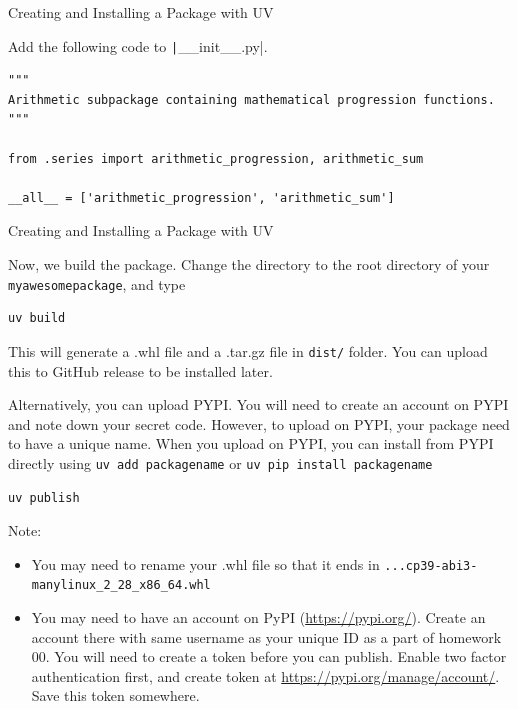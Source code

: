 \documentclass[aspectratio=169,xcolor=dvipsnames,svgnames,x11names,fleqn]{beamer}
\begin{document}
\begin{frame}[containsverbatim]{Creating and Installing a Package with UV}

Add the following code to \texttt|__init__.py|.

\begin{verbatim}
"""
Arithmetic subpackage containing mathematical progression functions.
"""

from .series import arithmetic_progression, arithmetic_sum

__all__ = ['arithmetic_progression', 'arithmetic_sum']

    \end{verbatim}

\end{frame}

\begin{frame}[containsverbatim]{Creating and Installing a Package with UV}

    \footnotesize

Now, we build the package. Change the directory to the root directory of your \texttt{myawesomepackage}, and type 

\begin{verbatim}
uv build
\end{verbatim}
    
This will generate a .whl file and a .tar.gz file in \texttt{dist/} folder. You can upload this to GitHub release to be installed later.

Alternatively, you can upload PYPI. You will need to create an account on PYPI and note down your secret code. However, to upload on PYPI, your package need to have a unique name. When you upload on PYPI, you can install from PYPI directly using \texttt{uv add packagename} or \texttt{uv pip install packagename}

\begin{verbatim}
uv publish
\end{verbatim}

\begin{tblock}{Note:}
\scriptsize
\begin{itemize}
\item You may need to rename your .whl file so that it ends in \texttt{...cp39-abi3-manylinux_2_28_x86_64.whl}
\item You  may need to have an account on PyPI (\url{https://pypi.org/}). Create an account there with same username as your unique ID as a part of homework 00. You will need to create a token before you can publish. Enable two factor authentication first, and create token at \url{https://pypi.org/manage/account/}. Save this token somewhere.
\end{itemize}
    
    
\end{tblock}


\end{frame}
\end{document}
